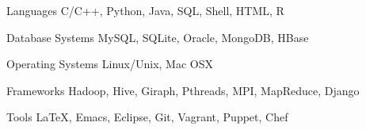 

\begin{cvskills}

  \cvskill
    {Languages} %
    {C/C++, Python, Java, SQL, Shell, HTML, R} %

  \cvskill
    {Database Systems} %
    {MySQL, SQLite, Oracle, MongoDB, HBase} %

  \cvskill
    {Operating Systems} %
    {Linux/Unix, Mac OSX}

  \cvskill
    {Frameworks} %
    {Hadoop, Hive, Giraph, Pthreads, MPI, MapReduce, Django}

  \cvskill
    {Tools} %
    {LaTeX, Emacs, Eclipse, Git, Vagrant, Puppet, Chef} %

\end{cvskills}
